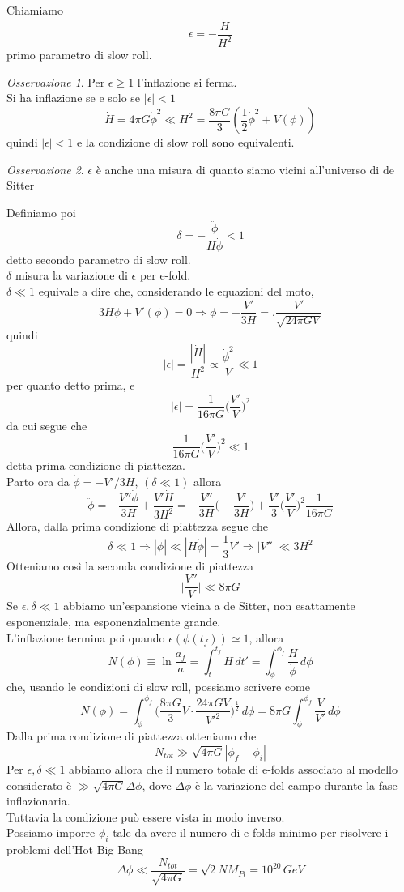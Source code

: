 \documentclass[10pt,a4paper]{article}
\let\oldmarginpar\marginpar
\renewcommand\marginpar[1]{\-\oldmarginpar[\raggedleft\footnotesize #1]%
	{\raggedright\footnotesize #1}}
\theoremstyle{break}
\theoremstyle{remark}
\newtheorem{oss}{Osservazione}
\theoremstyle{definition}
\newcommand{\ra}{\Rightarrow}
\begin{document}
Chiamiamo 
\[
\boxed{
\epsilon = -\frac{\dot{H}}{H^2}
}
\]
primo parametro di slow roll.
\begin{oss}
	Per $\epsilon \ge 1$ l'inflazione si ferma.\\
	Si ha inflazione se e solo se $|\epsilon| < 1$
	\[
	\dot{H} = 4 \pi G \dot{\phi}^2 \ll H^2 = \frac{8 \pi G}{3}(\frac12 \dot{\phi}^2 + V(\phi))
	\]
	quindi $|\epsilon| < 1$ e la condizione di slow roll sono equivalenti.	
\end{oss}
\begin{oss}
	\marginpar{Q. Perchè?}
	$\epsilon$ è anche una misura di quanto siamo vicini all'universo di de Sitter
\end{oss}
Definiamo poi
\[
\boxed{
\delta = -\frac{\ddot{\phi}}{H \dot{\phi}} < 1
}
\]
detto secondo parametro di slow roll.\\
$\delta$ misura la variazione di $\epsilon$ per e-fold.\\
$\delta \ll 1$ equivale a dire che, considerando le equazioni del moto,
\[
3H\dot{\phi} + V'(\phi) = 0 \ra \dot{\phi} = - \frac{V'}{3H} = .\frac{V'}{\sqrt{24 \pi G V}}
\]
quindi 
\[
|\epsilon| = \frac{|\dot{H}|}{H^2} \propto \frac{\dot{\phi}^2}{V} \ll 1 
\]
per quanto detto prima, e
\[
|\epsilon| = \frac{1}{16 \pi G} \bigg(\frac{V'}{V}\bigg)^2
\]
da cui segue che
\[
\boxed{
\frac{1}{16 \pi G}\bigg(\frac{V'}{V}\bigg)^2 \ll 1
}
\]
detta prima condizione di piattezza.\\
Parto ora da $\dot{\phi} = -V'/3H,\,(\delta \ll 1)$ allora
\[
\ddot{\phi} = -\frac{V''\dot{\phi}}{3H} + \frac{V'\dot{H}}{3 H^2} = -\frac{V''}{3H}\bigg(-\frac{V'}{3H}\bigg) + \frac{V'}{3} \bigg(\frac{V'}{V}\bigg)^2\frac{1}{16 \pi G}
\]
Allora, dalla prima condizione di piattezza segue che
\[
\delta \ll 1 \ra |\ddot{\phi}| \ll |H\dot{\phi}| = \frac13 V' \ra |V''| \ll 3H^2
\]
Otteniamo così la seconda condizione di piattezza
\[
\bigg|\frac{V''}{V}\bigg| \ll 8 \pi G
\]
Se $\epsilon, \delta \ll 1$ abbiamo un'espansione vicina a de Sitter, non esattamente esponenziale, ma esponenzialmente grande.
\\
L'inflazione termina poi quando $\epsilon(\phi(t_f)) \simeq 1$, allora
\[
N(\phi) \equiv \ln\frac{a_f}{a} = \int_{t}^{t_f}H\,dt' = \int_{\phi}^{\phi_f}\frac{H}{\dot{\phi}}\,d\phi
\]
che, usando le condizioni di slow roll, possiamo scrivere come
\[
N(\phi) = \int_{\phi}^{\phi_f} \bigg(\frac{8 \pi G}{3}V\cdot \frac{24 \pi G V}{V'^2}\bigg)^\frac12\,d\phi = 8 \pi G \int_{\phi}^{\phi_f}\frac{V}{V'}\, d\phi
\]
Dalla prima condizione di piattezza otteniamo che
\[
N_{tot} \gg \sqrt{4 \pi G}|\phi_f - \phi_i|
\]
Per $\epsilon, \delta \ll 1$ abbiamo allora che il numero totale di e-folds associato al modello considerato è $\gg \sqrt{4 \pi G}\Delta\phi$, dove $\Delta\phi$ è la variazione del campo durante la fase inflazionaria.\\
Tuttavia la condizione può essere vista in modo inverso.\\
Possiamo imporre $\phi_i$ tale da avere il numero di e-folds minimo per risolvere i problemi dell'Hot Big Bang
\[
\Delta\phi \ll \frac{N_{tot}}{\sqrt{4 \pi G}} = \sqrt{2}NM_{Pl} = 10^{20}\,GeV
\]
\end{document}
